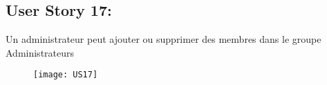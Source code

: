 \newpage
\subsection{User Story 17:}
Un administrateur peut ajouter ou supprimer des membres dans le groupe Administrateurs


\begin{figure}[!h]
  \begin{center}
        \texttt{[image: US17]}
        \label{US17-dia}
  \end{center}
\end{figure}